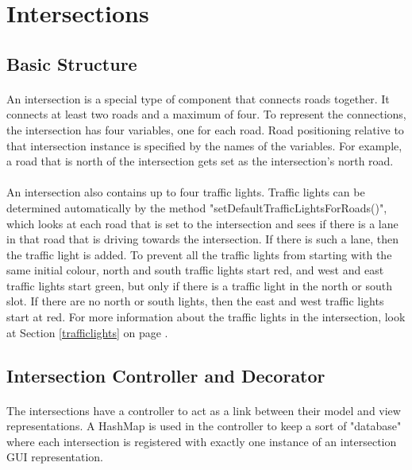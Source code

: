 \documentclass[a4paper,11pt,titlepage]{article}
\begin{document}
\section{Intersections}\label{intersectionsection}
\subsection{Basic Structure}
\paragraph{}
An intersection is a special type of component that connects roads together. It connects at least two roads and a maximum of four. To represent the connections, the intersection has four variables, one for each road. Road positioning relative to that intersection instance is specified by the names of the variables. For example, a road that is north of the intersection gets set as the intersection's north road.
\paragraph{}
An intersection also contains up to four traffic lights. Traffic lights can be determined automatically by the method "setDefaultTrafficLightsForRoads()", which looks at each road that is set to the intersection and sees if there is a lane in that road that is driving towards the intersection. If there is such a lane, then the traffic light is added. To prevent all the traffic lights from starting with the same initial colour, north and south traffic lights start red, and west and east traffic lights start green, but only if there is a traffic light in the north or south slot. If there are no north or south lights, then the east and west traffic lights start at red. For more information about the traffic lights in the intersection, look at Section \ref{trafficlights} on page \pageref{trafficlights}.
\subsection{Intersection Controller and Decorator}
\paragraph{}
The intersections have a controller to act as a link between their model and view representations. A HashMap is used in the controller to keep a sort of "database" where each intersection is registered with exactly one instance of an intersection GUI representation.
\end{document}
